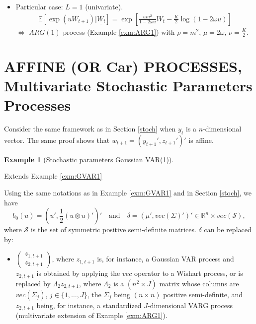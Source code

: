 \documentclass[
  12pt,
]{book}
\providecommand{\tightlist}{%
  \setlength{\itemsep}{0pt}\setlength{\parskip}{0pt}}
\theoremstyle{definition}
\theoremstyle{definition}
\newtheorem{example}{Example}[chapter]
\theoremstyle{definition}
\theoremstyle{definition}
\theoremstyle{remark}
\begin{document}
\begin{itemize}
\tightlist
\item
  Particular case: \(L=1\) (univariate).
  \begin{eqnarray*}
  \mathbb{E}[\exp(u W_{t+1})|\underline{W_t}] = \exp\left[
   \frac{u m^2}{1-2\omega u}W_t -
  \frac{K}{2}   \log(1-2\omega u)\right]
  \end{eqnarray*}
  \(\Leftrightarrow\) \(ARG(1)\) process (Example \ref{exm:ARG1}) with \(\rho = m^2\), \(\mu = 2\omega\), \(\nu = \frac{K}{2}\).
\end{itemize}

\hypertarget{affine-or-car-processes-multivariate-stochastic-parameters-processes}{%
\section{AFFINE (OR Car) PROCESSES, Multivariate Stochastic Parameters Processes}\label{affine-or-car-processes-multivariate-stochastic-parameters-processes}}

Consider the same framework as in Section \ref{stoch} when \(y_t\) is a \(n\)-dimensional vector. The same proof shows that \(w_{t+1}=(y_{t+1}',z_{t+1}')'\) is affine.

\begin{example}[Stochastic parameters Gaussian VAR(1)]
\protect\hypertarget{exm:RSVAR}{}\label{exm:RSVAR}

Extends Example \ref{exm:GVAR1}

Using the same notations as in Example \ref{exm:GVAR1} and in Section \ref{stoch}, we have
\[
b_0(u) = \left(u', \frac{1}{2} (u \otimes u)'\right)' \quad \mbox{and} \quad\delta = (\mu', vec(\Sigma)')' \in \mathbb{R}^n \times vec(\mathcal{S}),
\]
where \(\mathcal{S}\) is the set of symmetric positive semi-definite matrices. \(\delta\) can be replaced by:

\begin{itemize}
\tightlist
\item
  \(\left( \begin{array}{l} z_{1,t+1} \\ z_{2,t+1} \end{array} \right)\),
  where \(z_{1,t+1}\) is, for instance, a Gaussian VAR process and \(z_{2,t+1}\) is obtained by applying the \(vec\) operator to a Wishart process, or is replaced by \(\Lambda_2 z_{2,t+1}\), where \(\Lambda_2\) is a \((n^2 \times J)\) matrix whose columns are \(vec(\Sigma_j)\), \(j \in \{1,\dots,J\}\), the \(\Sigma_j\) being \((n \times n)\) positive semi-definite, and \(z_{2,t+1}\) being, for instance, a standardized \(J\)-dimensional VARG process (multivariate extension of Example \ref{exm:ARG1}).
\end{itemize}

\end{example}
\end{document}
